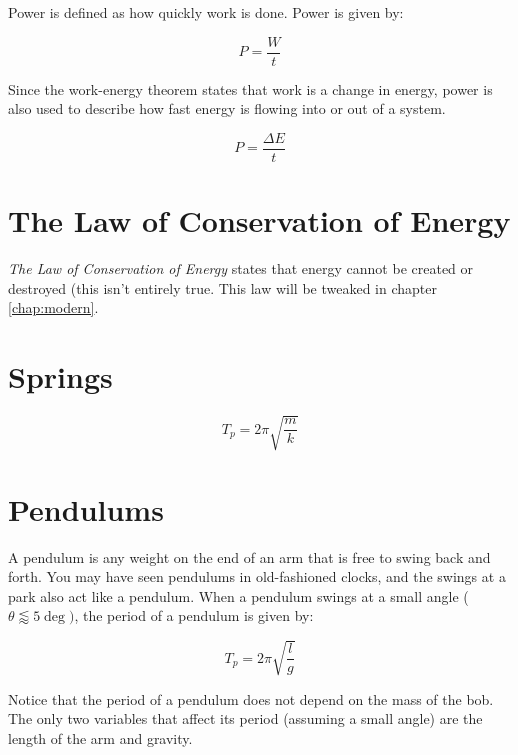 	
	Power is defined as how quickly work is done.  Power is given by:
	
	\begin{mdframed}[backgroundcolor=orange!20!white]
		\begin{equation}
			P = \frac{W}{t}
			\label{equation:power}
		\end{equation}
	\end{mdframed}
	
	Since the work-energy theorem states that work is a change in energy, power is also used to describe how fast energy is flowing into or out of a system.
	
	\begin{mdframed}[backgroundcolor=orange!20!white]
		\begin{equation}
			P = \frac{\Delta E}{t}
			\label{equation:poweralt}
		\end{equation}
	\end{mdframed}
	

	
	
	\section{The Law of Conservation of Energy}
	\textit{The Law of Conservation of Energy} states that energy cannot be created or destroyed (this isn't entirely true.  This law will be tweaked in chapter \ref{chap:modern}.
	
	\section{Springs}
	
		\begin{mdframed}[backgroundcolor=orange!20!white]
		\begin{equation}
		T_p = 2 \pi \sqrt{\frac{m}{k}}
		\label{eqn:springperiod}
		\end{equation}
	\end{mdframed}
	
	\section{Pendulums}
	A pendulum is any weight on the end of an arm that is free to swing back and forth.  You may have seen pendulums in old-fashioned clocks, and the swings at a park also act like a pendulum.  When a pendulum swings at a small angle ($\theta \lessapprox 5 \deg)$, the period of a pendulum is given by:
	
	\begin{mdframed}[backgroundcolor=orange!20!white]
		\begin{equation}
			T_p = 2 \pi \sqrt{\frac{l}{g}}
			\label{eqn:pendulumperiod}
		\end{equation}
	\end{mdframed}
	
	Notice that the period of a pendulum does not depend on the mass of the bob.  The only two variables that affect its period (assuming a small angle) are the length of the arm and gravity.  
	
	
	 
	

		


	


